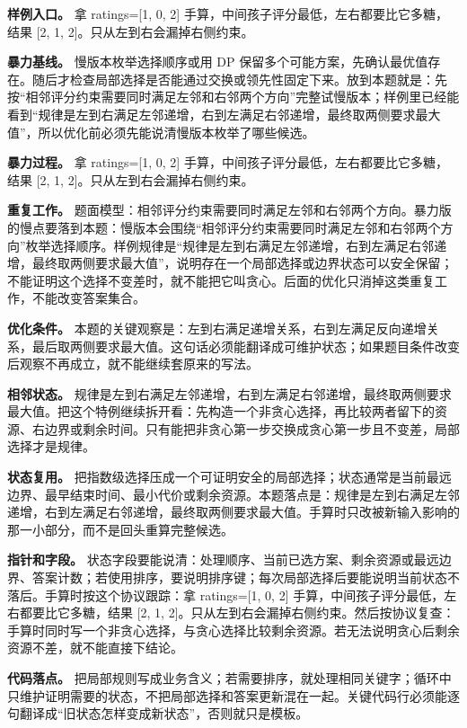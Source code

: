 \textbf{样例入口。} 拿 ratings=[1, 0, 2] 手算，中间孩子评分最低，左右都要比它多糖，结果 [2, 1, 2]。只从左到右会漏掉右侧约束。

\textbf{暴力基线。} 慢版本枚举选择顺序或用 DP 保留多个可能方案，先确认最优值存在。随后才检查局部选择是否能通过交换或领先性固定下来。放到本题就是：先按“相邻评分约束需要同时满足左邻和右邻两个方向”完整试慢版本；样例里已经能看到“规律是左到右满足左邻递增，右到左满足右邻递增，最终取两侧要求最大值”，所以优化前必须先能说清慢版本枚举了哪些候选。

\textbf{暴力过程。} 拿 ratings=[1, 0, 2] 手算，中间孩子评分最低，左右都要比它多糖，结果 [2, 1, 2]。只从左到右会漏掉右侧约束。

\textbf{重复工作。} 题面模型：相邻评分约束需要同时满足左邻和右邻两个方向。暴力版的慢点要落到本题：慢版本会围绕“相邻评分约束需要同时满足左邻和右邻两个方向”枚举选择顺序。样例规律是“规律是左到右满足左邻递增，右到左满足右邻递增，最终取两侧要求最大值”，说明存在一个局部选择或边界状态可以安全保留；不能证明这个选择不变差时，就不能把它叫贪心。后面的优化只消掉这类重复工作，不能改变答案集合。

\textbf{优化条件。} 本题的关键观察是：左到右满足递增关系，右到左满足反向递增关系，最后取两侧要求最大值。这句话必须能翻译成可维护状态；如果题目条件改变后观察不再成立，就不能继续套原来的写法。

\textbf{相邻状态。} 规律是左到右满足左邻递增，右到左满足右邻递增，最终取两侧要求最大值。把这个特例继续拆开看：先构造一个非贪心选择，再比较两者留下的资源、右边界或剩余时间。只有能把非贪心第一步交换成贪心第一步且不变差，局部选择才是规律。

\textbf{状态复用。} 把指数级选择压成一个可证明安全的局部选择；状态通常是当前最远边界、最早结束时间、最小代价或剩余资源。本题落点是：规律是左到右满足左邻递增，右到左满足右邻递增，最终取两侧要求最大值。手算时只改被新输入影响的那一小部分，而不是回头重算完整候选。

\textbf{指针和字段。} 状态字段要能说清：处理顺序、当前已选方案、剩余资源或最远边界、答案计数；若使用排序，要说明排序键；每次局部选择后要能说明当前状态不落后。手算时按这个协议跟踪：拿 ratings=[1, 0, 2] 手算，中间孩子评分最低，左右都要比它多糖，结果 [2, 1, 2]。只从左到右会漏掉右侧约束。然后按协议复查：手算时同时写一个非贪心选择，与贪心选择比较剩余资源。若无法说明贪心后剩余资源不差，就不能直接下结论。

\textbf{代码落点。} 把局部规则写成业务含义；若需要排序，就处理相同关键字；循环中只维护证明需要的状态，不把局部选择和答案更新混在一起。关键代码行必须能逐句翻译成“旧状态怎样变成新状态”，否则就只是模板。

